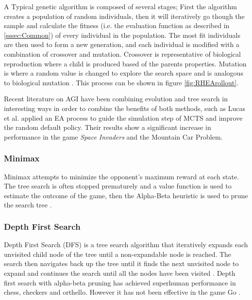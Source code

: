 \documentclass[journal]{IEEEtran}
\begin{document}
			
			
			A Typical genetic algorithm is composed of several stages;
			First the algorithm creates a population of random individuals, then it will iteratively go though the sample and calculate the fitness (i.e. the evaluation function as described in \ref{sssec:Common}) of every individual in the population. 
			The most fit individuals are then used to form a new generation, and each individual is modified with a combination of crossover and mutation. 
			Crossover is representative of biological reproduction where a child is produced based of the parents properties. Mutation is where a random value is changed to explore the search space and is analogous to biological mutation \cite{back1996evolutionary, vcrepinvsek2013exploration, perez2013rolling, gaina2017rolling, gaina2017analysis}.
			This process can be shown in figure \ref{fig:RHEArollout}.
			


			Recent literature on AGI have been combining evolution and tree search in interesting ways in order to combine the benefits of both methods, such as Lucas et al. \cite{lucas2014fast} applied an EA process to guide the simulation step of MCTS and improve the random default policy. Their results show a significant increase in performance in the game \textit{Space Invaders} and the Mountain Car Problem.
			
		
		
		\subsubsection{Minimax}

				Minimax attempts to minimize the opponent's maximum reward at each state. The tree search is often stopped prematurely and a value function is used to estimate the outcome of the game, then the Alpha-Beta heuristic is used to prune the search tree \cite{browne2012survey, knuth1975analysis}.
			
		\subsubsection{Depth First Search}
				Depth First Search (DFS) is a tree search algorithm that iteratively expands each unvisited child node of the tree until a non-expandable node is reached. The search then navigates back up the tree until it finds the next unvisited node to expand and continues the search until all the nodes have been visited \cite{perez2014solving}.
				Depth first search with alpha-beta pruning \cite{knuth1975analysis} has achieved superhuman performance in chess, checkers and orthello. However it has not been effective in the game Go \cite{silver2016mastering}.
			
\end{document}
